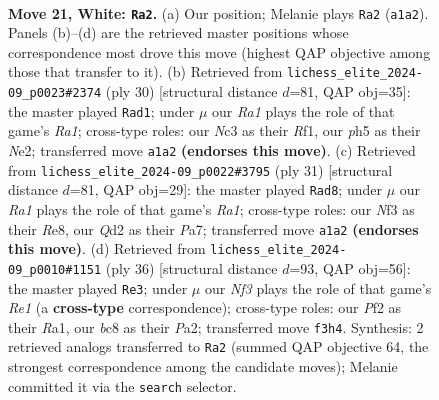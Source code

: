 \documentclass[11pt]{article}
\begin{document}
\clearpage

\begin{figure}[p]\centering
\begin{subfigure}{0.46\textwidth}\centering
\resizebox{\linewidth}{!}{%
\newchessgame
\chessboard[
  setfen={2b1r1k1/r3qpp1/np1p1n2/4p2p/P1B1P3/2N2NP1/2PQ1P1P/R1R3K1 w - - 3 21},
  showmover=false,
  pgfstyle=straightmove, color=movearrow, markmove={a1-a2}
]}
\caption{}
\end{subfigure}\hfill
\begin{subfigure}{0.46\textwidth}\centering
\resizebox{\linewidth}{!}{%
\newchessgame
\chessboard[
  setfen={r2qr1k1/pp3pb1/2p1nnpp/3p4/3P3B/2NQPP2/PP2N1PP/R4RK1 w - - 9 16},
  showmover=false,
  pgfstyle=straightmove, color=movearrow, markmove={a1-d1}
]}
\caption{}
\end{subfigure}
\\[4pt]
\begin{subfigure}{0.46\textwidth}\centering
\resizebox{\linewidth}{!}{%
\newchessgame
\chessboard[
  setfen={r3r1k1/pp1n1ppp/2pqpn2/5b2/3P4/1N3B2/PPPQNPPP/3RR1K1 b - - 7 16},
  showmover=false,
  pgfstyle=straightmove, color=movearrow, markmove={a8-d8}
]}
\caption{}
\end{subfigure}\hfill
\begin{subfigure}{0.46\textwidth}\centering
\resizebox{\linewidth}{!}{%
\newchessgame
\chessboard[
  setfen={r2r2k1/pp1qn1b1/3p1p2/3p1bp1/3P4/Q1P2NB1/PP1N1PP1/R3R1K1 w - - 2 19},
  showmover=false,
  pgfstyle=straightmove, color=movearrow, markmove={e1-e3}
]}
\caption{}
\end{subfigure}
\caption{\textbf{Move 21, White: \texttt{Ra2}.} (a) Our position; Melanie plays \texttt{Ra2} (\texttt{a1a2}). Panels (b)--(d) are the retrieved master positions whose correspondence most drove this move (highest QAP objective among those that transfer to it). (b) Retrieved from \texttt{lichess\_elite\_2024-09\_p0023\#2374} (ply 30) [structural distance $d$=81, QAP obj=35]: the master played \texttt{Rad1}; under $\mu$ our \emph{Ra1} plays the role of that game's \emph{Ra1}; cross-type roles: our \emph{N}c3 as their \emph{R}f1, our \emph{p}h5 as their \emph{N}e2; transferred move \texttt{a1a2} \textbf{(endorses this move)}. (c) Retrieved from \texttt{lichess\_elite\_2024-09\_p0022\#3795} (ply 31) [structural distance $d$=81, QAP obj=29]: the master played \texttt{Rad8}; under $\mu$ our \emph{Ra1} plays the role of that game's \emph{Ra1}; cross-type roles: our \emph{N}f3 as their \emph{R}e8, our \emph{Q}d2 as their \emph{P}a7; transferred move \texttt{a1a2} \textbf{(endorses this move)}. (d) Retrieved from \texttt{lichess\_elite\_2024-09\_p0010\#1151} (ply 36) [structural distance $d$=93, QAP obj=56]: the master played \texttt{Re3}; under $\mu$ our \emph{Nf3} plays the role of that game's \emph{Re1} (a \textbf{cross-type} correspondence); cross-type roles: our \emph{P}f2 as their \emph{R}a1, our \emph{b}c8 as their \emph{P}a2; transferred move \texttt{f3h4}. Synthesis: 2 retrieved analogs transferred to \texttt{Ra2} (summed QAP objective 64, the strongest correspondence among the candidate moves); Melanie committed it via the \texttt{search} selector.}
\label{fig:thought-m40}
\end{figure}
\end{document}
